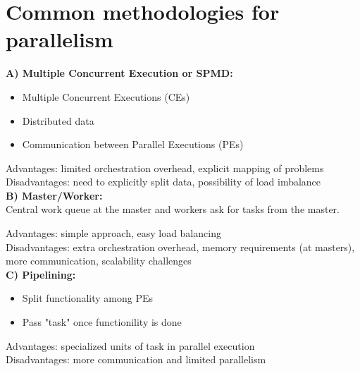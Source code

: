 \documentclass[12pt, a4paper]{report}
\begin{document}
\section{Common methodologies for parallelism}
{\bfseries A) Multiple Concurrent Execution or SPMD:}
\begin{itemize}
    \item Multiple Concurrent Executions (CEs)
    \item Distributed data
    \item Communication between Parallel Executions (PEs)
\end{itemize}

Advantages: limited orchestration overhead, explicit mapping of problems\\
Disadvantages: need to explicitly split data, possibility of load imbalance\\

{\bfseries B) Master/Worker:}\\ 
Central work queue at the master and workers ask for tasks from the master.

Advantages: simple approach, easy load balancing\\
Disadvantages: extra orchestration overhead, memory requirements (at masters), more communication, scalability 
challenges\\

{\bfseries C) Pipelining:}
\begin{itemize}
    \item Split functionality among PEs
    \item Pass "task" once functionility is done
\end{itemize}

Advantages: specialized units of task in parallel execution\\
Disadvantages: more communication and limited parallelism\\
\end{document}
